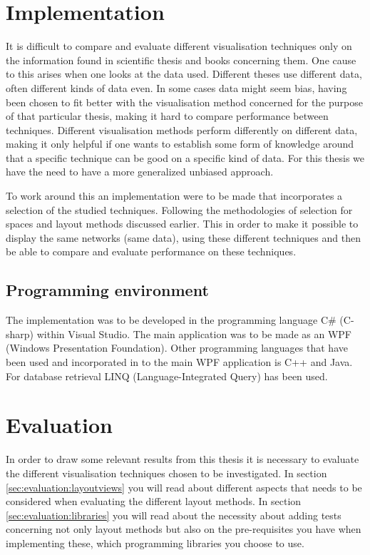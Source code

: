 \documentclass[a4paper,11pt]{kth-mag}
\begin{document}
\section{Implementation}
\label{sec:Implementation} 
It is difficult to compare and evaluate different visualisation techniques only on the information found in scientific thesis and books concerning them. 
One cause to this arises when one looks at the data used. Different theses use different data, often different kinds of data even. In some cases data might seem bias, having been chosen to fit better with the 
visualisation method concerned for the purpose of that particular thesis, making it hard to compare performance between techniques. Different visualisation methods perform differently on different data, making it 
only helpful if one wants to establish some form of knowledge around that a specific technique can be good on a specific kind of data. For this thesis we have the need to have a more generalized unbiased approach.

To work around this an implementation were to be made that incorporates a selection of the studied techniques. Following the methodologies of selection for spaces and layout methods discussed earlier.
This in order to make it possible to display the same networks (same data), using these different techniques and then be able to compare and evaluate performance on these techniques.
\subsection{Programming environment}
The implementation was to be developed in the programming language C\# \space (C-sharp)\cite{website:MSDN} within Visual Studio\cite{website:VisualStudio}. 
The main application was to be made as an WPF (Windows Presentation Foundation)\cite{website:WPF}. Other programming languages that have been used and incorporated in to the main WPF application is C++\cite{website:C++} 
and Java\cite{website:Java}. For database retrieval LINQ (Language-Integrated Query)\cite{website:LINQ} has been used.
\section{Evaluation}
\label{sec:evaluation}
In order to draw some relevant results from this thesis it is necessary to evaluate the different visualisation techniques chosen to be investigated. In section \ref{sec:evaluation:layoutviews} you will read 
about different aspects that needs to be considered when evaluating the different layout methods. In section \ref{sec:evaluation:libraries} you will read about the necessity about adding tests concerning not
 only layout methods but also on the pre-requisites you have when implementing these, which programming libraries you choose to use.
\end{document}
